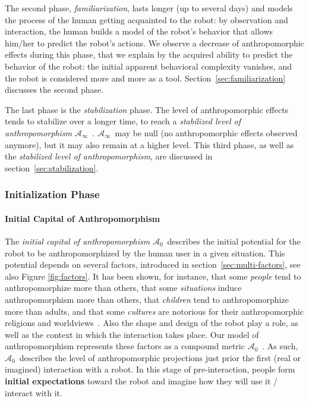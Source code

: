 \documentclass{frontiersSCNS} %
\newcommand{\ICA}{{$\mathcal{A}_0$~}}
\newcommand{\SLA}{{$\mathcal{A}_\infty$~}}
\begin{document}
The second phase, \emph{familiarization}, lasts longer (up to several days) and
models the process of the human getting acquainted to the robot: by observation
and interaction, the human builds a model of the robot's behavior that allows
him/her to predict the robot's actions. We observe a decrease of
anthropomorphic effects during this phase, that we explain by the acquired
ability to predict the behavior of the robot: the initial apparent behavioral
complexity vanishes, and the robot is considered more and more as a tool.
Section~\ref{sec:familiarization} discusses the second phase.

The last phase is the \emph{stabilization} phase. The level of anthropomorphic
effects tends to stabilize over a longer time, to reach a \emph{stabilized
level of anthropomorphism} \SLA. \SLA may be null (no anthropomorphic
effects observed anymore), but it may also remain at a higher level.  This
third phase, as well as the \emph{stabilized level of anthropomorphism}, are
discussed in section~\ref{sec:stabilization}.


\subsubsection{Initialization Phase\\}
\label{sec:initialization}

\paragraph{Initial Capital of Anthropomorphism\\}
\label{sec:ica}

The \emph{initial capital of anthropomorphism} \ICA describes the initial potential
for the robot to be anthropomorphized by the human user in a given situation.
This potential depends on several factors, introduced in
section~\ref{sec:multi-factors}, see also Figure \ref{fig:factors}. It has been shown, for instance, that
some \textit{people} tend to anthropomorphize more than others, that some
\textit{situations} induce anthropomorphism more than others, that
\textit{children} tend to anthropomorphize more than adults, and that some
\textit{cultures} are notorious for their anthropomorphic religions and
worldviews~\citep{epley_when_2008}. Also the shape and design of the robot play a
role, as well as the context in which the interaction takes place. Our model of
anthropomorphism represents these factors as a compound metric \ICA. As such,
\ICA describes the level of anthropomorphic projections just prior the first
(real or imagined) interaction with a robot. In this stage of pre-interaction, people
form \textbf{initial expectations} toward the robot and imagine how they will use it /
interact with it.
\end{document}
